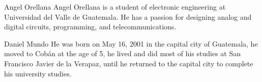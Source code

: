 \begin{IEEEbiography}{Angel Orellana}
Angel Orellana is a student of electronic engineering at Universidad del Valle 
de Guatemala. He has a passion for designing analog and digital circuits, 
programming, and telecommunications.
\end{IEEEbiography}

\begin{IEEEbiography}{Daniel Mundo}
    He was born on May 16, 2001 in the capital city of Guatemala, he moved to Cobán at the age of 5, he lived and did most of his studies at San Francisco Javier de la Verapaz, until he returned to the capital city to complete his university studies.
    \end{IEEEbiography}
        
